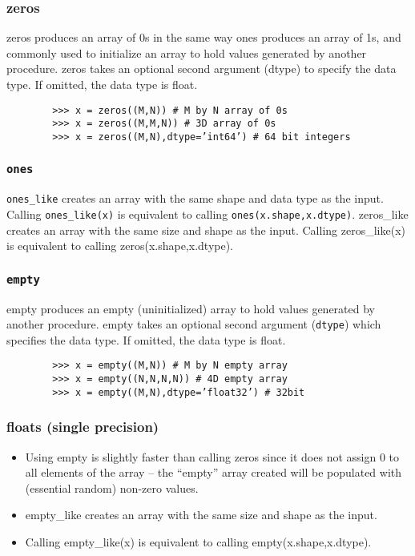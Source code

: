 \documentclass[MASTER.tex]{subfiles}
\begin{document}
\begin{frame}[fragile]
	\frametitle{zeros}
	zeros produces an array of 0s in the same way ones produces an array of 1s, and commonly used to initialize
	an array to hold values generated by another procedure. zeros takes an optional second argument
	(dtype) to specify the data type. If omitted, the data type is float.
	\begin{framed}
		\begin{verbatim}
		>>> x = zeros((M,N)) # M by N array of 0s
		>>> x = zeros((M,M,N)) # 3D array of 0s
		>>> x = zeros((M,N),dtype=’int64’) # 64 bit integers
		\end{verbatim}
	\end{framed}

	
\end{frame}
\begin{frame}[fragile]
	\frametitle{\texttt{ones}}
	\texttt{ones\_like} creates an array with the same shape and data type as the input. Calling \texttt{ones\_like(x)} is equivalent
	to calling \texttt{ones(x.shape,x.dtype)}.
	zeros\_like creates an array with the same size and shape as the input. Calling zeros\_like(x) is equivalent
	to calling zeros(x.shape,x.dtype).
\end{frame}
\begin{frame}[fragile]
	\frametitle{\texttt{empty}}
	empty produces an empty (uninitialized) array to hold values generated by another procedure. empty takes
	an optional second argument (\texttt{dtype}) which specifies the data type. If omitted, the data type is float.
	\begin{framed}
		\begin{verbatim}
		>>> x = empty((M,N)) # M by N empty array
		>>> x = empty((N,N,N,N)) # 4D empty array
		>>> x = empty((M,N),dtype=’float32’) # 32bit
		\end{verbatim}
	\end{framed}
\end{frame}
\begin{frame}[fragile]
	\frametitle{floats (single precision)}
	\begin{itemize}
	\item Using empty is slightly faster than calling zeros since it does not assign 0 to all elements of the array –
	the “empty” array created will be populated with (essential random) non-zero values. 
	\item empty\_like creates
	an array with the same size and shape as the input. 
	\item Calling empty\_like(x) is equivalent to calling
	empty(x.shape,x.dtype).
	\end{itemize}
\end{frame}
\end{document}
